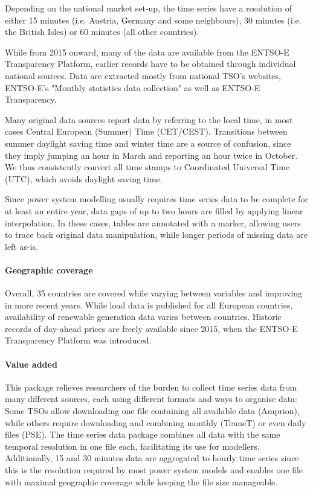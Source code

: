 \documentclass[article,sort&compress]{elsarticle}
\begin{document}
Depending on the national market set-up, the time series have a resolution of either 15 minutes (i.e. Austria, Germany and some neighbours), 30 minutes (i.e. the British Isles) or 60 minutes (all other countries).

While from 2015 onward, many of the data are available from the ENTSO-E Transparency Platform, earlier records have to be obtained through individual national sources. Data are extracted mostly from national TSO's websites, ENTSO-E's "Monthly statistics data collection" as well as ENTSO-E Transparency. 

Many original data sources report data by referring to the local time, in most cases Central European (Summer) Time (CET/CEST). Transitions between summer daylight saving time and winter time are a source of confusion, since they imply jumping an hour in March and reporting an hour twice in October. We thus consistently convert all time stamps to Coordinated Universal Time (UTC), which avoids daylight saving time.

Since power system modelling usually requires time series data to be complete for at least an entire year, data gaps of up to two hours are filled by applying linear interpolation. In these cases, tables are annotated with a marker, allowing users to trace back original data manipulation, while longer periods of missing data are left as-is.

\paragraph{Geographic coverage}
Overall, 35 countries are covered while varying between variables and improving in more recent years. While load data is published for all European countries, availability of renewable generation data varies between countries. Historic records of day-ahead prices are freely available since 2015, when the ENTSO-E Transparency Platform was introduced.

\paragraph{Value added}
This package relieves researchers of the burden to collect time series data from many different sources, each using different formats and ways to organise data: Some TSOs allow downloading one file containing all available data (Amprion), while others require downloading and combining monthly (TenneT) or even daily files (PSE). The time series data package combines all data with the same temporal resolution in one file each, facilitating its use for modellers. Additionally, 15 and 30 minutes data are aggregated to hourly time series since this is the resolution required by most power system models and enables one file with maximal geographic coverage while keeping the file size manageable.
\end{document}
